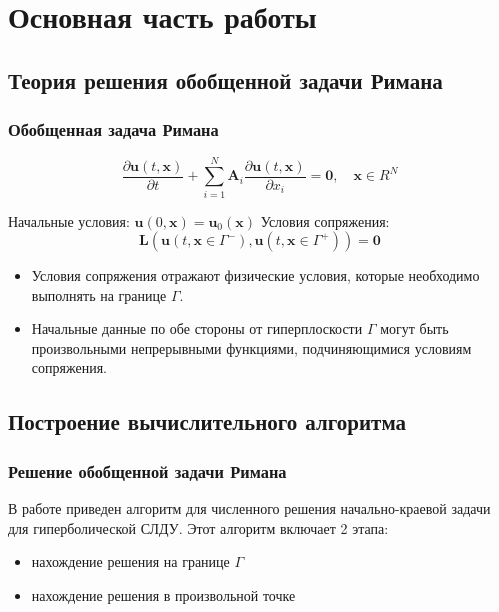\documentclass[unicode,aspectratio=43]{beamer}
\begin{document}
\section{Основная часть работы}
\subsection{Теория решения обобщенной задачи Римана}


\begin{frame}\frametitle{Обобщенная задача Римана}
	
	\begin{equation*} \label{eq:1}
	\frac{{\partial {\mathbf{u}}\left( {t,{\mathbf{x}}} \right)}}{{\partial t}} +
	\sum\limits_{i=1}^N {{\mathbf{A}_i} \frac{{\partial {\mathbf{u}}\left( {t,{\mathbf{x}}}
				\right)}}{{\partial {x_i}}}}  = {\mathbf{0}},\quad {\mathbf{x}} \in {R^N}
	\end{equation*}
	
	Начальные условия: $ \mathbf{u} (0,\mathbf{x})  = \mathbf{u}_0 (\mathbf{x}) $
	\pause
	Условия сопряжения: 
	\begin{equation*} \label{eq:3.3}
	\mathbf{L} ( \mathbf{u} (t, \mathbf{x} \in \Gamma^-), \mathbf{u} (t, \mathbf{x}\in \Gamma^+) ) = {\mathbf{0}}		
	\end{equation*}
	
	\begin{itemize}
		\item Условия сопряжения отражают физические условия, которые необходимо выполнять на границе  $ \Gamma $. 
		\item 	Начальные данные по обе стороны от гиперплоскости $\Gamma$  могут быть произвольными непрерывными функциями, подчиняющимися условиям сопряжения. 
	\end{itemize}
	
\end{frame}


\subsection{Построение вычислительного алгоритма}


\begin{frame}\frametitle{Решение обобщенной задачи Римана}
	В работе приведен алгоритм для численного решения начально-краевой задачи для гиперболической СЛДУ. Этот алгоритм включает 2 этапа:
	\begin{itemize}
		\item нахождение решения на границе $\Gamma$
		\item нахождение решения в произвольной точке
	\end{itemize}
\end{frame}	
\end{document}
